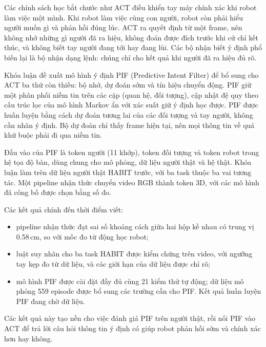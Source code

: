 
Các chính sách học bắt chước như ACT điều khiển tay máy chính xác khi robot làm việc một mình. Khi robot làm việc cùng con người, robot còn phải hiểu người muốn gì và phản hồi đúng lúc. ACT ra quyết định từ một frame, nên không nhớ những gì người đã ra hiệu, không đoán được đích trước khi cử chỉ kết thúc, và không biết tay người đang tới hay đang lùi. Các bộ nhận biết ý định phổ biến lại là bộ nhận dạng lệnh: chúng chỉ cho kết quả khi người đã ra hiệu đủ rõ.

Khóa luận đề xuất mô hình ý định PIF (Predictive Intent Filter) để bổ sung cho ACT ba thứ còn thiếu: bộ nhớ, dự đoán sớm và tín hiệu chuyển động. PIF giữ một phân phối niềm tin trên các cặp (quan hệ, đối tượng), cập nhật đệ quy theo cấu trúc lọc của mô hình Markov ẩn với xác suất giữ ý định học được. PIF được huấn luyện bằng cách dự đoán tương lai của các đối tượng và tay người, không cần nhãn ý định. Bộ dự đoán chỉ thấy frame hiện tại, nên mọi thông tin về quá khứ buộc phải đi qua niềm tin.

Đầu vào của PIF là token người (11 khớp), token đối tượng và token robot trong hệ tọa độ bàn, dùng chung cho mô phỏng, dữ liệu người thật và hệ thật. Khóa luận làm trên dữ liệu người thật HABIT trước, với ba task thuộc ba vai tương tác. Một pipeline nhận thức chuyển video RGB thành token 3D, với các mô hình đã công bố được chọn bằng số đo.

Các kết quả chính đến thời điểm viết:
\begin{itemize}
  \item pipeline nhận thức đạt sai số khoảng cách giữa hai hộp kề nhau có trung vị 0.58\,cm, so với mốc đo từ động học robot;
  \item luật suy nhãn cho ba task HABIT được kiểm chứng trên video, với ngưỡng tay kẹp đo từ dữ liệu, và các giới hạn của dữ liệu được chỉ rõ;
  \item mô hình PIF được cài đặt đầy đủ cùng 21 kiểm thử tự động; dữ liệu mô phỏng 559 episode được bổ sung các trường cần cho PIF. Kết quả huấn luyện PIF đang chờ dữ liệu.
\end{itemize}
Các kết quả này tạo nền cho việc đánh giá PIF trên người thật, rồi nối PIF vào ACT để trả lời câu hỏi thông tin ý định có giúp robot phản hồi sớm và chính xác hơn hay không.
